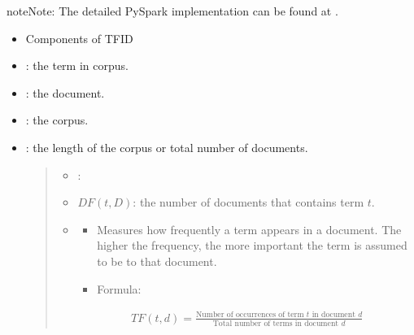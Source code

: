 \documentclass[letterpaper,11pt,english]{sphinxmanual}
\begin{document}
\begin{sphinxadmonition}{note}{Note:}
\sphinxAtStartPar
The detailed PySpark implementation can be found at .
\end{sphinxadmonition}
\begin{itemize}
\item {} 
\sphinxAtStartPar
Components of TF\sphinxhyphen{}ID

\item {} 
\sphinxAtStartPar
{}: the term in corpus.

\item {} 
\sphinxAtStartPar
{}: the document.

\item {} 
\sphinxAtStartPar
{}: the corpus.

\item {} 
\sphinxAtStartPar
{}: the length of the corpus or total number of documents.
\begin{quote}
\begin{itemize}
\item {} 
\sphinxAtStartPar
{}:

\item {} 
\sphinxAtStartPar
\(DF(t,D)\): the number of documents that contains term \(t\).

\item {} \begin{description}
\begin{itemize}
\item {} 
\sphinxAtStartPar
Measures how frequently a term appears in a document. The higher the frequency, the more important the term is assumed to be to that document.

\item {} 
\sphinxAtStartPar
Formula:

\end{itemize}
\begin{equation*}
\begin{split}TF(t, d) = \frac{\text{Number of occurrences of term } t \text{ in document } d}{\text{Total number of terms in document } d}\end{split}
\end{equation*}
\end{description}


\end{itemize}
\end{quote}
\end{itemize}
\end{document}
